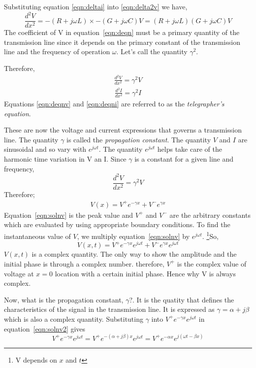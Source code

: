 Substituting equation \eqref{eqn:deltai} into \eqref{eqn:delta2v} we have,
\begin{dmath}
\frac{d^{2}V}{dx^{2}} = - (R + j\omega L)\times -(G + j\omega C)V = (R + j\omega L)(G + j\omega C)V 
\label{eqn:deqn}
\end{dmath}   
The coefficient of V in equation~\ref{eqn:deqn} must be a primary quantity of the transmission line since it depends on the primary constant of the transmission line and the frequency of operation $ \omega$. Let's call the quantity $ \gamma^{2}$.

Therefore, 
\begin{align}
\frac{d^{2}V}{dx^{2}} = \gamma^{2}V 
\label{eqn:deqnv}
\end{align}
\begin{align}
\frac{d^{2}I}{dx^{2}} = \gamma^{2}I 
\label{eqn:deqni}
\end{align}
Equations \ref{eqn:deqnv} and \ref{eqn:deqni} are referred to as the \emph{telegrapher's equation}.

These are now the voltage and current expressions that governs a transmission line. The quantity $ \gamma $ is called the \emph{propagation constant}. The quantity $V$ and $I$ are sinusoidal and so vary with $e^{j\omega t}$. The quantity $e^{j\omega t}$ helps take care of the harmonic time variation in V an I. 
Since $\gamma$ is a constant for a given line and frequency, 
\[\frac{d^{2}V}{dx^{2}} = \gamma^{2}V\]
Therefore; 
\begin{align}
V(x) = V^{+} e ^{- \gamma x} + V^{-}e^{\gamma x}  
\label{eqn:solnv}
\end{align}
Equation~\eqref{eqn:solnv} is the peak value and $V^+$ and $V^-$ are the arbitrary constants which are evaluated by using appropriate boundary conditions. To find the instantaneous value of $V$, we multiply equation~\eqref{eqn:solnv} by $e^{j\omega t}$. \footnote{V depends on $x$ and $t$}So,
\begin{dmath}
V(x,t) = V^{+} e^{-\gamma x}e^{j\omega t} + V^{-} e^{\gamma x}e^{j\omega t}
\label{eqn:solnv2}
\end{dmath}
$V(x,t)$ is a complex quantity. The only way to show the amplitude and the initial phase is through a complex number. therefore, $ V^{+}$ is the complex value of voltage at $x=0$ location with a certain initial phase. Hence why V is always complex. 

Now, what is the propagation constant, $\gamma$?. It is the quatity that defines the characteristics of the signal in the transmission line. It is expressed as $ \gamma = \alpha + j\beta $	 which is also a complex quantity. Substituting $\gamma$ into $V^{+}e^{- \gamma x}e^{j \omega t}$ in equation~\eqref{eqn:solnv2} gives
\begin{dmath}
V^{+}e^{- \gamma x}e^{j \omega t} = V^{+}e^{-( \alpha + j \beta )x}e^{j \omega t} = V^{+}e^{-\alpha x}e^{j(\omega t - \beta x)}
\end{dmath}

